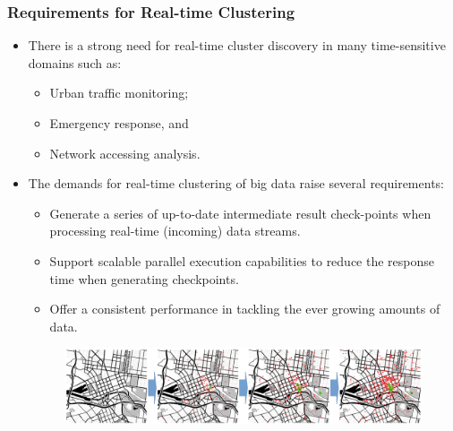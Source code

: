\begin{frame}
    \frametitle{Requirements for Real-time Clustering}
    \begin{itemize} \small
	    \item There is a strong need for real-time cluster discovery in many time-sensitive domains such as:
        \begin{itemize} \small
            \item Urban traffic monitoring;
            \item Emergency response, and
            \item Network accessing analysis.
        \end{itemize}
	    \item The demands for real-time clustering of big data raise several requirements:
        \begin{itemize} \small
            \item Generate a series of up-to-date intermediate result check-points when processing real-time (incoming) data streams.
            \item Support scalable parallel execution capabilities to reduce the response time when generating checkpoints. 
            \item Offer a consistent performance in tackling the ever growing amounts of data.
        \end{itemize}
        \begin{figure}
            \centering
            \includegraphics[width=0.6\linewidth]{resource/figures/cluster_checkpoints.png}
        \end{figure}
    \end{itemize}
\end{frame}

